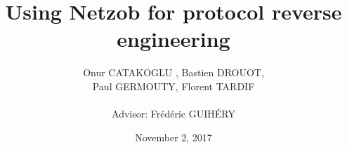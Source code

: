 \documentclass{beamer}
\newcounter{m} %
\newcounter{c} %
\begin{document}



\title{\bf Using Netzob for protocol reverse engineering }   
\author{Onur CATAKOGLU , Bastien DROUOT,\\ Paul GERMOUTY, Florent TARDIF\\~\\ Advisor: Fr\'{e}d\'{e}ric GUIH\'{E}RY} 
\date{November 2, 2017} 



\end{document}
